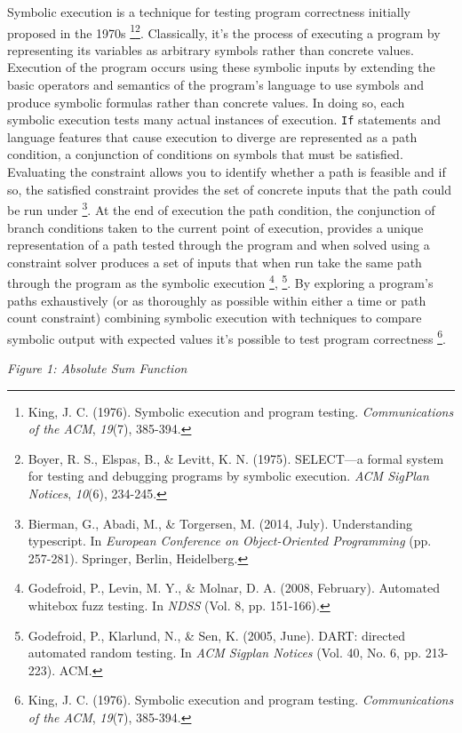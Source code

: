 \documentclass[]{article}
\begin{document}
Symbolic execution is a technique for testing program correctness
initially proposed in the 1970s \footnote{King, J. C. (1976). Symbolic
  execution and program testing. \emph{Communications of the ACM},
  \emph{19}(7), 385-394.}\footnote{Boyer, R. S., Elspas, B., \& Levitt,
  K. N. (1975). SELECT---a formal system for testing and debugging
  programs by symbolic execution. \emph{ACM SigPlan Notices},
  \emph{10}(6), 234-245.}. Classically, it's the process of executing a
program by representing its variables as arbitrary symbols rather than
concrete values. Execution of the program occurs using these symbolic
inputs by extending the basic operators and semantics of the program's
language to use symbols and produce symbolic formulas rather than
concrete values. In doing so, each symbolic execution tests many actual
instances of execution. \texttt{If} statements and language features
that cause execution to diverge are represented as a path condition, a
conjunction of conditions on symbols that must be satisfied. Evaluating
the constraint allows you to identify whether a path is feasible and if
so, the satisfied constraint provides the set of concrete inputs that
the path could be run under \footnote{Bierman, G., Abadi, M., \&
  Torgersen, M. (2014, July). Understanding typescript. In
  \emph{European Conference on Object-Oriented Programming} (pp.
  257-281). Springer, Berlin, Heidelberg.}. At the end of execution the
path condition, the conjunction of branch conditions taken to the
current point of execution, provides a unique representation of a path
tested through the program and when solved using a constraint solver
produces a set of inputs that when run take the same path through the
program as the symbolic execution \footnote{Godefroid, P., Levin, M. Y.,
  \& Molnar, D. A. (2008, February). Automated whitebox fuzz testing. In
  \emph{NDSS} (Vol. 8, pp. 151-166).}, \footnote{Godefroid, P.,
  Klarlund, N., \& Sen, K. (2005, June). DART: directed automated random
  testing. In \emph{ACM Sigplan Notices} (Vol. 40, No. 6, pp. 213-223).
  ACM.}. By exploring a program's paths exhaustively (or as thoroughly
as possible within either a time or path count constraint) combining
symbolic execution with techniques to compare symbolic output with
expected values it's possible to test program correctness \footnote{King,
  J. C. (1976). Symbolic execution and program testing.
  \emph{Communications of the ACM}, \emph{19}(7), 385-394.}.

\emph{Figure 1: Absolute Sum Function}
\end{document}
